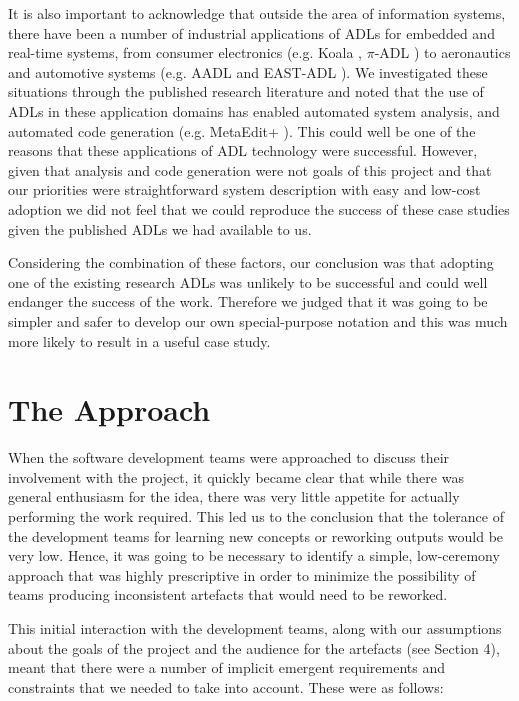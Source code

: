  It is also important to acknowledge that outside the area of information systems, there have been a number of industrial applications of ADLs for embedded and real-time systems, from consumer electronics (e.g. 
  Koala \cite{vanommering2000-koala}, $\pi$-ADL \cite{oquendo2004-piadl}) to aeronautics and automotive systems (e.g. AADL \cite{sae2009-aadl} and EAST-ADL \cite{cuenot2010-east}). We investigated these situations through the published research literature and noted that the use of ADLs in these application domains has enabled automated system analysis, and automated code generation (e.g. MetaEdit+ \cite{smolander1991-metaedit}). This could well be one of the reasons that these applications of ADL technology were successful.  However, given that analysis and code generation were not goals of this project and that our priorities were straightforward system description with easy and low-cost adoption we did not feel that we could reproduce the success of these case studies given the published ADLs we had available to us.

Considering the combination of these factors, our conclusion was that adopting one of the existing research ADLs was unlikely to be successful and could well endanger the success of the work.  Therefore we judged that it was going to be simpler and safer to develop our own special-purpose notation and this was much more likely to result in a useful case study.  
  
\section{The Approach}

  When the software development teams were approached to discuss their involvement with the project, it quickly became clear that while there was general enthusiasm for the idea, there was very little appetite for actually performing the work required.  This led us to the conclusion that the tolerance of the development teams for learning new concepts or reworking outputs would be very low.  Hence, it was going to be necessary to identify a simple, low-ceremony approach that was highly prescriptive in order to minimize the possibility of teams producing inconsistent artefacts that would need to be reworked.

  This initial interaction with the development teams, along with our assumptions about the goals of the project and the audience for the artefacts (see Section 4), meant that there were a number of implicit emergent requirements and constraints that we needed to take into account.  These were as follows:

